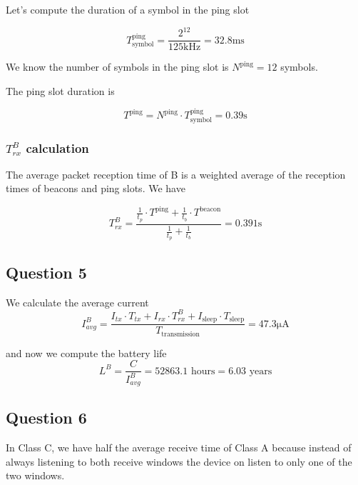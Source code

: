\documentclass[]{article}
\begin{document}
	Let's compute the duration of a symbol in the ping slot
	
	\begin{equation}
		T_{\text{symbol}}^{\text{ping}} = \frac{2^{12}}{125\text{kHz}} = 32.8\text{ms}
	\end{equation}
	
	We know the number of symbols in the ping slot is $N^{\text{ping}} = 12$ symbols.
	
	The ping slot duration is
	
	\begin{equation}
		T^{\text{ping}} = N^{\text{ping}} \cdot T_{\text{symbol}}^{\text{ping}} = 0.39\text{s}
	\end{equation}
	
	\subsubsection*{$T_{rx}^B$ calculation}
	
	The average packet reception time of B is a weighted average of the reception times of beacons and ping slots. We have
	
	\begin{equation}
		T_{rx}^B = \frac{\frac{1}{t_p} \cdot T^{\text{ping}} + \frac{1}{t_b} \cdot T^{\text{beacon}}}{\frac{1}{t_p} + \frac{1}{t_b}} = 0.391\text{s}
	\end{equation}
	
	\subsection*{Question 5}
	
	We calculate the average current
	\begin{equation}
		I_{avg}^B = \frac{I_{tx} \cdot T_{tx} + I_{rx} \cdot T_{rx}^B + I_{\text{sleep}} \cdot T_{\text{sleep}}}{T_{\text{transmission}}} = 47.3\mathrm{\mu A}
	\end{equation}
	
	and now we compute the battery life
	\begin{equation}
		L^B = \frac{C}{I_{avg}^B} = 52863.1 \text{ hours} = 6.03 \text{ years}
	\end{equation}
	
	\subsection*{Question 6}
	
	In Class C, we have half the average receive time of Class A because instead of always listening to both receive windows the device on listen to only one of the two windows.
	
\end{document}
